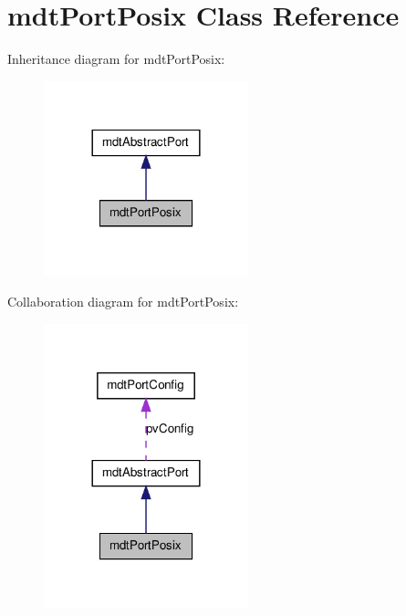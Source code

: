 \hypertarget{classmdt_port_posix}{
\section{mdtPortPosix Class Reference}
\label{classmdt_port_posix}
}


Inheritance diagram for mdtPortPosix:\nopagebreak
\begin{figure}[H]
\begin{center}
\leavevmode
\includegraphics[width=168pt]{classmdt_port_posix__inherit__graph}
\end{center}
\end{figure}


Collaboration diagram for mdtPortPosix:\nopagebreak
\begin{figure}[H]
\begin{center}
\leavevmode
\includegraphics[width=168pt]{classmdt_port_posix__coll__graph}
\end{center}
\end{figure}
